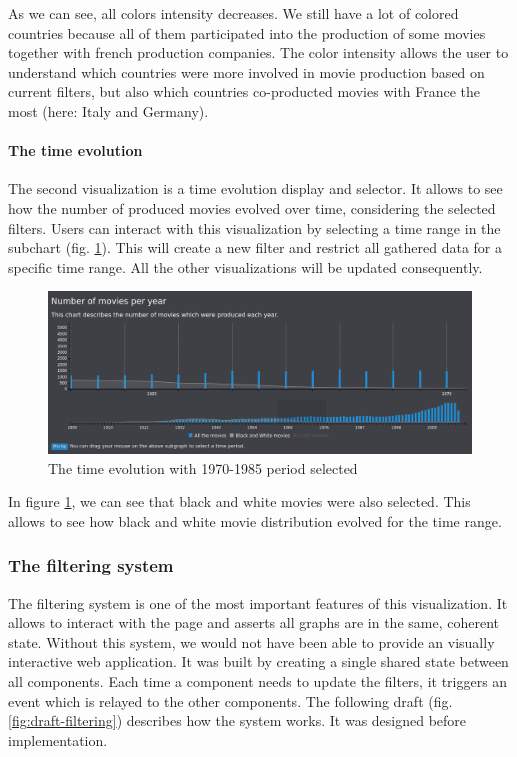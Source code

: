 \documentclass[a4paper,10pt]{article}
\begin{document}
As we can see, all colors intensity decreases. We still have a lot of colored countries
because all of them participated into the production of some movies together with
french production companies. The color intensity allows the user to understand which
countries were more involved in movie production based on current filters, but also
which countries co-producted movies with France the most (here: Italy and Germany).

\paragraph{The time evolution}

The second visualization is a time evolution display and selector. It allows to
see how the number of produced movies evolved over time, considering the selected
filters. Users can interact with this visualization by selecting a time range in the
subchart (fig. \ref{fig:time-selection}). This will create a new filter and restrict all gathered data for a specific
time range. All the other visualizations will be updated consequently.

\begin{figure}[ht]
  \centering
  \includegraphics[width=1\linewidth]{images/screens/time-selection.png}
  \caption{The time evolution with 1970-1985 period selected} \label{fig:time-selection}
\end{figure}

In figure \ref{fig:time-selection}, we can see that black and white movies were
also selected. This allows to see how black and white movie distribution evolved
for the time range.

\subsubsection{The filtering system} \label{sec:filtering-system}

The filtering system is one of the most important features of this visualization.
It allows to interact with the page and asserts all graphs are in the same, coherent
state. Without this system, we would not have been able to provide an visually interactive web application.
It was built by creating a single shared state between all components. Each
time a component needs to update the filters, it triggers an event which is relayed
to the other components. The following draft (fig. \ref{fig:draft-filtering}) describes how the system works. It
was designed before implementation.
\end{document}
